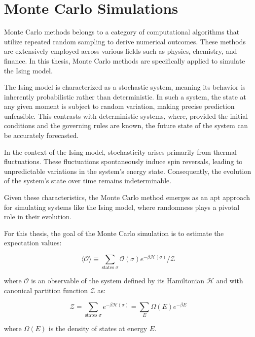 \section{Monte Carlo Simulations}

Monte Carlo methods belongs to a category of computational algorithms that
utilize repeated random sampling to derive numerical outcomes. These methods are
extensively employed across various fields such as physics, chemistry, and
finance. In this thesis, Monte Carlo methods are specifically applied to
simulate the Ising model.

The Ising model is characterized as a stochastic system, meaning its behavior is
inherently probabilistic rather than deterministic. In such a system, the state
at any given moment is subject to random variation, making precise prediction
unfeasible. This contrasts with deterministic systems, where, provided the
initial conditions and the governing rules are known, the future state of the
system can be accurately forecasted.

In the context of the Ising model, stochasticity arises primarily from thermal
fluctuations. These fluctuations spontaneously induce spin reversals, leading to
unpredictable variations in the system's energy state. Consequently, the
evolution of the system's state over time remains indeterminable.

Given these characteristics, the Monte Carlo method emerges as an apt approach
for simulating systems like the Ising model, where randomness plays a pivotal
role in their evolution.

For this thesis, the goal of the Monte Carlo simulation is to estimate the
expectation values:

\begin{equation}
\langle \mathcal{O} \rangle \equiv \sum_{\text{states } \sigma} \mathcal{O}(\sigma) e^{-\beta \mathcal{H}(\sigma)} / \mathcal{Z}
\end{equation}

where $\mathcal{O}$ is an observable of the system defined by its Hamiltonian
$\mathcal{H}$ and with canonical partition function $\mathcal{Z}$ as:

\begin{equation}
\mathcal{Z} = \sum_{\text{states } \sigma} e^{-\beta \mathcal{H}(\sigma)} = \sum_{E} \Omega(E) e^{-\beta E}
\end{equation}

where $\Omega(E)$ is the density of states at energy $E$.

